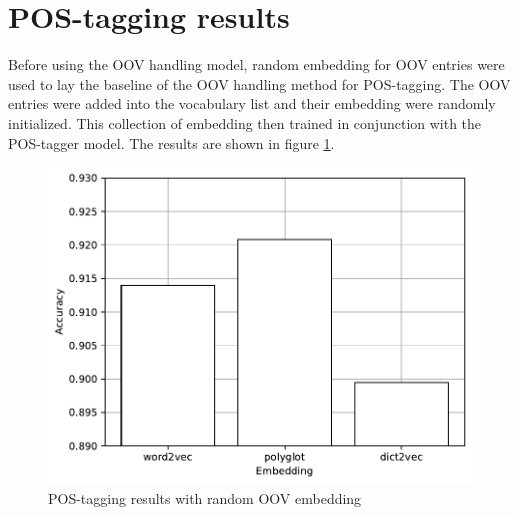    \section{POS-tagging results}
      Before using the OOV handling model, random embedding for OOV
      entries were used to lay the baseline of the OOV handling method
      for POS-tagging. The OOV entries were added into the vocabulary
      list and their embedding were randomly initialized. This
      collection of embedding then trained in conjunction with the
      POS-tagger model. The results are shown in figure
      \ref{fig:postag_random_results}.
      \begin{figure}[H]
        \centering
        \includegraphics[width=0.8\linewidth]{images/random_graph.pdf}
        \caption{POS-tagging results with random OOV embedding}
        \label{fig:postag_random_results}
      \end{figure}

